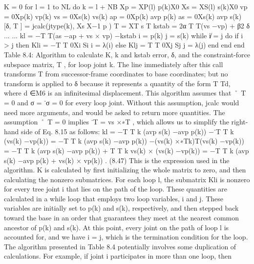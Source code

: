 K = 0 for l = 1 to NL do k = l + NB Xp = XP(l) p(k)X0 Xs = XS(l) s(k)X0 vp = 0Xp(k) vp(k) vs = 0Xs(k) vs(k) ap = 0Xp(k) avp p(k) as = 0Xs(k) avp s(k) [δ, T ] = jcalc(jtype(k), Xs X−1 p ) T = XT s T kstab = 2α T T(vs −vp) + β2 δ ... ... kl = −T T(as −ap + vs × vp) −kstab i = p(k) j = s(k) while i̸ = j do if i > j then Kli = −T T 0Xi Si i = λ(i) else Klj = T T 0Xj Sj j = λ(j) end end end Table 8.4: Algorithm to calculate K, k and kstab error, δ, and the constraint-force subspace matrix, T , for loop joint k. The line immediately after this call transforms T from successor-frame coordinates to base coordinates; but no transform is applied to δ because it represents a quantity of the form T Td, where d ∈M6 is an infinitesimal displacement. This algorithm assumes that ˚ T = 0 and σ = ˙σ = 0 for every loop joint. Without this assumption, jcalc would need more arguments, and would be asked to return more quantities. The assumption ˚ T = 0 implies ˙T = vs ×∗T , which allows us to simplify the right-hand side of Eq. 8.15 as follows: kl = −T T k (avp s(k) −avp p(k)) −˙T T k (vs(k) −vp(k)) = −T T k (avp s(k) −avp p(k)) −(vs(k) ×∗Tk)T(vs(k) −vp(k)) = −T T k (avp s(k) −avp p(k)) + T T k vs(k) × (vs(k) −vp(k)) = −T T k (avp s(k) −avp p(k) + vs(k) × vp(k)) . (8.47) This is the expression used in the algorithm. K is calculated by first initializing the whole matrix to zero, and then calculating the nonzero submatrices. For each loop l, the submatrix Kli is nonzero for every tree joint i that lies on the path of the loop. These quantities are calculated in a while loop that employs two loop variables, i and j. These variables are initially set to p(k) and s(k), respectively, and then stepped back toward the base in an order that guarantees they meet at the nearest common ancestor of p(k) and s(k). At this point, every joint on the path of loop l is accounted for, and we have i = j, which is the termination condition for the loop. The algorithm presented in Table 8.4 potentially involves some duplication of calculations. For example, if joint i participates in more than one loop, then

